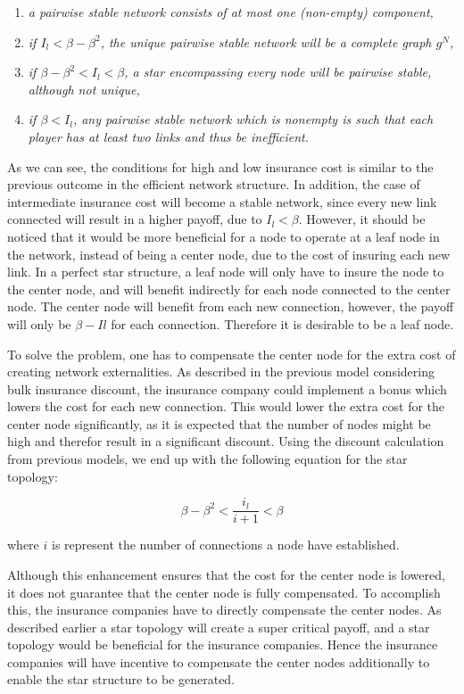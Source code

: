\begin{enumerate}

\item \textit{a pairwise stable network consists of at most one (non-empty) component,}
\item \textit{if $I_{l}<\beta - \beta^2$, the unique pairwise stable network will be a complete graph $g^N$, }
\item \textit{if $\beta - \beta^2 < I_{l} < \beta $, a star encompassing every node will be pairwise stable, although not unique,}
\item \textit{if $\beta < I_{l}$, any pairwise stable network which is nonempty is such that each player has at least two links and thus be inefficient. }
\end{enumerate}

As we can see, the conditions for high and low insurance cost is similar to the previous outcome in the efficient network structure. In addition, the case of intermediate insurance cost will become a stable network, since every new link connected will result in a higher payoff, due to $I_{l} < \beta$. However, it should be noticed that it would be more beneficial for a node to operate at a leaf node in the network, instead of being a center node, due to the cost of insuring each new link. In a perfect star structure, a leaf node will only have to insure the node to the center node, and will benefit indirectly for each node connected to the center node. The center node will benefit from each new connection, however, the payoff will only be $\beta - I{l}$ for each connection. Therefore it is desirable to be a leaf node. 

To solve the problem, one has to compensate the center node for the extra cost of creating network externalities. As described in the previous model considering bulk insurance discount, the insurance company could implement a bonus which lowers the cost for each new connection. This would lower the extra cost for the center node significantly, as it is expected that the number of nodes might be high and therefor result in a significant discount. 
Using the discount calculation from previous models, we end up with the following equation for the star topology:

\begin{equation}
\beta-\beta^2<\frac{i_{l}}{i+1}< \beta
\end{equation}



where $i $ is represent the number of connections a node have established. 

Although this enhancement ensures that the cost for the center node is lowered, it does not guarantee that the center node is fully compensated. To accomplish this, the insurance companies have to directly compensate the center nodes. As described earlier a star topology will create a super critical payoff, and a star topology would be beneficial for the insurance companies. Hence the insurance companies will have incentive to compensate the center nodes additionally to enable the star structure to be generated. 




